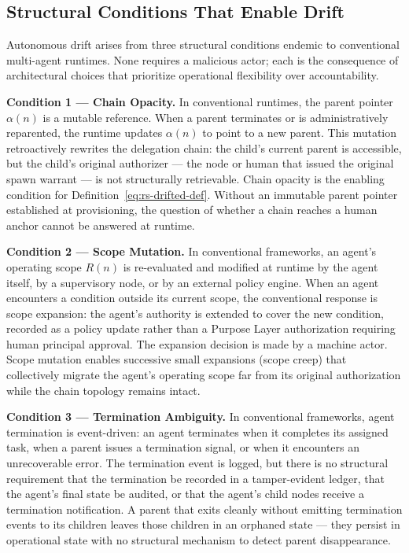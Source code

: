 \subsection{Structural Conditions That Enable Drift}
\label{sec:rs-drift-conditions}

Autonomous drift arises from three structural conditions endemic to conventional multi-agent runtimes. None requires a malicious actor; each is the consequence of architectural choices that prioritize operational flexibility over accountability.

\medskip
\noindent\textbf{Condition 1 — Chain Opacity.}
In conventional runtimes, the parent pointer $\alpha(n)$ is a mutable reference. When a parent terminates or is administratively reparented, the runtime updates $\alpha(n)$ to point to a new parent. This mutation retroactively rewrites the delegation chain: the child's current parent is accessible, but the child's original authorizer — the node or human that issued the original spawn warrant — is not structurally retrievable. Chain opacity is the enabling condition for Definition~\ref{eq:rs-drifted-def}. Without an immutable parent pointer established at provisioning, the question of whether a chain reaches a human anchor cannot be answered at runtime.

\medskip
\noindent\textbf{Condition 2 — Scope Mutation.}
In conventional frameworks, an agent's operating scope $R(n)$ is re-evaluated and modified at runtime by the agent itself, by a supervisory node, or by an external policy engine. When an agent encounters a condition outside its current scope, the conventional response is scope expansion: the agent's authority is extended to cover the new condition, recorded as a policy update rather than a Purpose Layer authorization requiring human principal approval. The expansion decision is made by a machine actor. Scope mutation enables successive small expansions (scope creep) that collectively migrate the agent's operating scope far from its original authorization while the chain topology remains intact.

\medskip
\noindent\textbf{Condition 3 — Termination Ambiguity.}
In conventional frameworks, agent termination is event-driven: an agent terminates when it completes its assigned task, when a parent issues a termination signal, or when it encounters an unrecoverable error. The termination event is logged, but there is no structural requirement that the termination be recorded in a tamper-evident ledger, that the agent's final state be audited, or that the agent's child nodes receive a termination notification. A parent that exits cleanly without emitting termination events to its children leaves those children in an orphaned state — they persist in operational state with no structural mechanism to detect parent disappearance.

